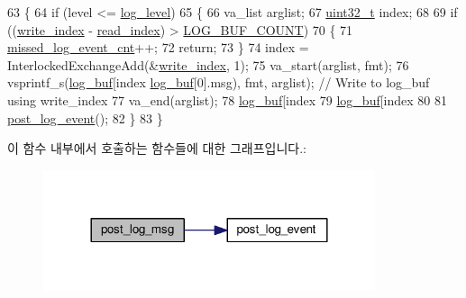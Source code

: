 \begin{DoxyCode}
63 \{
64     \textcolor{keywordflow}{if} (level <= \hyperlink{classavdecc__lib_1_1log_aa07e39131a3e0ab9ffd691b0f455134d}{log\_level})
65     \{
66         va\_list arglist;
67         \hyperlink{parse_8c_a6eb1e68cc391dd753bc8ce896dbb8315}{uint32\_t} index;
68 
69         \textcolor{keywordflow}{if} ((\hyperlink{classavdecc__lib_1_1log_a44d246646acf5f95a78a87d606f22a42}{write\_index} - \hyperlink{classavdecc__lib_1_1log_a2ccf0f8cb3b20ac18cc9c7bcff1084ad}{read\_index}) > \hyperlink{classavdecc__lib_1_1log_adf764cbdea00d65edcd07bb9953ad2b7a46b4b58fe7f3d2ff3dc4e8f781261727}{LOG\_BUF\_COUNT})
70         \{
71             \hyperlink{classavdecc__lib_1_1log_a3ab71103159d076fcb40d836993a59bc}{missed\_log\_event\_cnt}++;
72             \textcolor{keywordflow}{return};
73         \}
74         index = InterlockedExchangeAdd(&\hyperlink{classavdecc__lib_1_1log_a44d246646acf5f95a78a87d606f22a42}{write\_index}, 1);
75         va\_start(arglist, fmt);
76         vsprintf\_s(\hyperlink{classavdecc__lib_1_1log_a2a5ef536ff60c1a9a38f36c0df2f38da}{log\_buf}[index %
      \hyperlink{classavdecc__lib_1_1log_a2a5ef536ff60c1a9a38f36c0df2f38da}{log\_buf}[0].msg), fmt, arglist); \textcolor{comment}{// Write to log\_buf using write\_index}
77         va\_end(arglist);
78         \hyperlink{classavdecc__lib_1_1log_a2a5ef536ff60c1a9a38f36c0df2f38da}{log\_buf}[index %
79         \hyperlink{classavdecc__lib_1_1log_a2a5ef536ff60c1a9a38f36c0df2f38da}{log\_buf}[index %
80 
81         \hyperlink{classavdecc__lib_1_1log_a2897e19ed8bde731a37c566aa6a57084}{post\_log\_event}();
82     \}
83 \}
\end{DoxyCode}


이 함수 내부에서 호출하는 함수들에 대한 그래프입니다.\+:
\nopagebreak
\begin{figure}[H]
\begin{center}
\leavevmode
\includegraphics[width=276pt]{classavdecc__lib_1_1log_a68139a6297697e4ccebf36ccfd02e44a_cgraph}
\end{center}
\end{figure}


